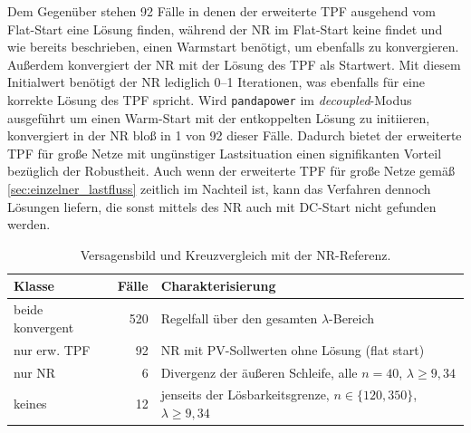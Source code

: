 Dem Gegenüber stehen 92 Fälle in denen der erweiterte TPF ausgehend vom Flat-Start eine Lösung finden, während der NR im Flat-Start keine findet und wie bereits beschrieben, einen Warmstart benötigt, um ebenfalls zu konvergieren.
Außerdem konvergiert der NR mit der Lösung des TPF als Startwert.
Mit diesem Initialwert benötigt der NR lediglich 0--1 Iterationen, was ebenfalls für eine korrekte Lösung des TPF spricht.
Wird \texttt{pandapower} im \emph{decoupled}-Modus ausgeführt um einen Warm-Start mit der entkoppelten Lösung zu initiieren, konvergiert in der NR bloß in 1 von 92 dieser Fälle. 
Dadurch bietet der erweiterte TPF für große Netze mit ungünstiger Lastsituation einen signifikanten Vorteil bezüglich der Robustheit. 
Auch wenn der erweiterte TPF für große Netze gemäß \cref{sec:einzelner_lastfluss} zeitlich im Nachteil ist, kann das Verfahren dennoch Lösungen liefern, die sonst mittels des NR auch mit DC-Start nicht gefunden werden.




\begin{table}[htbp]
	\centering
	\small
	\caption{Versagensbild und Kreuzvergleich mit der NR-Referenz.}
	\label{tab:lam-fail}
	\begin{tabularx}{\textwidth}{lrX}
		\toprule
		Klasse & Fälle & Charakterisierung \\
		\midrule
		beide konvergent & 520 & Regelfall über den gesamten $\lambda$-Bereich \\
		nur erw. TPF & 92 & NR mit PV-Sollwerten ohne Lösung (flat start) \\
		nur NR & 6 & Divergenz der äußeren Schleife, alle $n=40$, $\lambda\ge9{,}34$ \\
		keines & 12 & jenseits der Lösbarkeitsgrenze, $n\in\{120,350\}$, $\lambda\ge9{,}34$ \\
		\bottomrule
	\end{tabularx}
\end{table}





